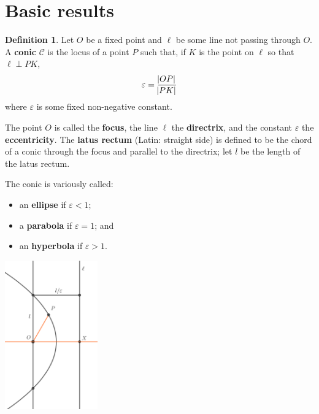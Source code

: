 \documentclass[a4paper,leqno,10pt]{article}
\theoremstyle{exercise}
\theoremstyle{plain}
\theoremstyle{definition}
\newtheorem*{defn}{Definition}
\theoremstyle{remark}
\newcommand{\df}{\textbf}
\begin{document}
\section{Basic results}
\begin{defn}
  Let $ O $ be a fixed point and $ \ell $ be some line not passing through $ O $. A \df{conic} $ \mathcal{C} $ is the locus of a point $ P $ such
  that, if $ K $ is the point on $ \ell $ so that $ \ell \perp PK $,
  \begin{displaymath}
    \varepsilon = \frac{\abs{OP}}{\abs{PK}}
  \end{displaymath}
  where $ \varepsilon $ is some fixed non-negative constant.

  The point $ O $ is called the \df{focus}, the line $ \ell $ the \df{directrix}, and the constant $\varepsilon$ the \df{eccentricity}.
  The \df{latus rectum} (Latin: straight side) is defined to be the chord of a conic through the focus and parallel to the
  directrix; let $ l $ be the length of the latus rectum.

  The conic is variously called:
  \begin{itemize}
    \item an \df{ellipse} if $ \varepsilon < 1 $;
    \item a \df{parabola} if $ \varepsilon = 1 $; and
    \item an \df{hyperbola} if $ \varepsilon > 1 $.
  \end{itemize}

  \begin{center}
    \includegraphics[width=0.3\textwidth]{polar}
  \end{center}
\end{defn}
\end{document}
